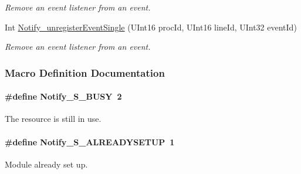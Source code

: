 \begin{DoxyCompactItemize}
\begin{DoxyCompactList}\small\item\em Remove an event listener from an event. \end{DoxyCompactList}\item 
Int \hyperlink{_notify_8h_a7d8a78106ebe364b994f828d9b90f12f}{Notify\-\_\-unregister\-Event\-Single} (U\-Int16 proc\-Id, U\-Int16 line\-Id, U\-Int32 event\-Id)
\begin{DoxyCompactList}\small\item\em Remove an event listener from an event. \end{DoxyCompactList}\end{DoxyCompactItemize}


\subsubsection{Macro Definition Documentation}
\paragraph[{Notify\-\_\-\-S\-\_\-\-B\-U\-S\-Y}]{\setlength{\rightskip}{0pt plus 5cm}\#define Notify\-\_\-\-S\-\_\-\-B\-U\-S\-Y~2}\label{_notify_8h_a0d58ddfdb5d08f6ca1de749701033450}


The resource is still in use. 

\paragraph[{Notify\-\_\-\-S\-\_\-\-A\-L\-R\-E\-A\-D\-Y\-S\-E\-T\-U\-P}]{\setlength{\rightskip}{0pt plus 5cm}\#define Notify\-\_\-\-S\-\_\-\-A\-L\-R\-E\-A\-D\-Y\-S\-E\-T\-U\-P~1}\label{_notify_8h_a4a3b8a694b528547f8478d0b9e24289c}


Module already set up. 

